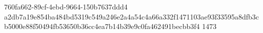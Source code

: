 760fa662-89cf-4ebd-9664-150b7637ddd4
a2db7a19e854ba484bd5319c549a246e2a4a54c4a66a332f1471103ae93f33595a8dfb3cb5000e88f50494fb53650b36cc4ea7b14b39e9c0fa462491becbb3f4
1473
